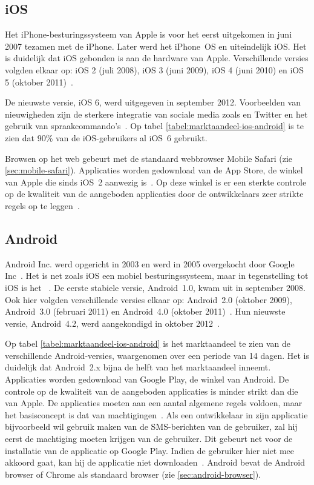 \subsection{iOS}
Het iPhone-besturingssysteem van Apple is voor het eerst uitgekomen in juni 2007 tezamen met de iPhone. 
Later werd het iPhone~OS en uiteindelijk iOS. 
Het is duidelijk dat iOS gebonden is aan de hardware van Apple. 
Verschillende versies volgden elkaar op: iOS 2 (juli 2008), iOS 3 (juni 2009), iOS 4 (juni 2010) en iOS 5 (oktober 2011)~\cite{Deitel2012, PhilDutson2012}. 

De nieuwste versie, iOS 6, werd uitgegeven in september 2012. 
Voorbeelden van nieuwigheden zijn de sterkere integratie van sociale media zoals \fb{} en Twitter en het gebruik van spraakcommando's~\cite{Deitel2012}. 
Op tabel \ref{tabel:marktaandeel-ios-android} is te zien dat 90\% van de iOS-gebruikers al iOS~6 gebruikt.

Browsen op het web gebeurt met de standaard webbrowser Mobile Safari (zie \ref{sec:mobile-safari}). 
Applicaties worden gedownload van de App Store, de winkel van Apple die sinds iOS~2 aanwezig is~\cite{Deitel2012}. 
Op deze winkel is er een sterkte controle op de kwaliteit van de aangeboden applicaties door de ontwikkelaars zeer strikte regels op te leggen~\cite{Apple2010a}.

\subsection{Android}
Android Inc. werd opgericht in 2003 en werd in 2005 overgekocht door Google Inc~\cite{Satyesh2012}. 
Het is net zoals iOS een mobiel besturingssysteem, maar in tegenstelling tot iOS is het ~\cite{David2011}. 
De eerste stabiele versie, Android~1.0, kwam uit in september 2008. 
Ook hier volgden verschillende versies elkaar op: Android~2.0 (oktober 2009), Android~3.0 (februari 2011) en Android~4.0 (oktober 2011)~\cite{Satyesh2012}. 
Hun nieuwste versie, Android~4.2, werd aangekondigd in oktober 2012~\cite{Sawers2012}. 

Op tabel \ref{tabel:marktaandeel-ios-android} is het marktaandeel te zien van de verschillende Android-versies, waargenomen over een periode van 14 dagen. 
Het is duidelijk dat Android~2.x bijna de helft van het marktaandeel inneemt.
Applicaties worden gedownload van Google Play,  de winkel van Android. 
De controle op de kwaliteit van de aangeboden applicaties is minder strikt dan die van Apple.
De applicaties moeten aan een aantal algemene regels voldoen, maar het basisconcept is dat van machtigingen~\cite{Android2013b}.
Als een ontwikkelaar in zijn applicatie bijvoorbeeld wil gebruik maken van de SMS-berichten van de gebruiker, zal hij eerst de machtiging moeten krijgen van de gebruiker.
Dit gebeurt net voor de installatie van de applicatie op Google Play.
Indien de gebruiker hier niet mee akkoord gaat, kan hij de applicatie niet downloaden~\cite{Android2013a}.
Android bevat de Android browser of Chrome als standaard browser (zie \ref{sec:android-browser}).

